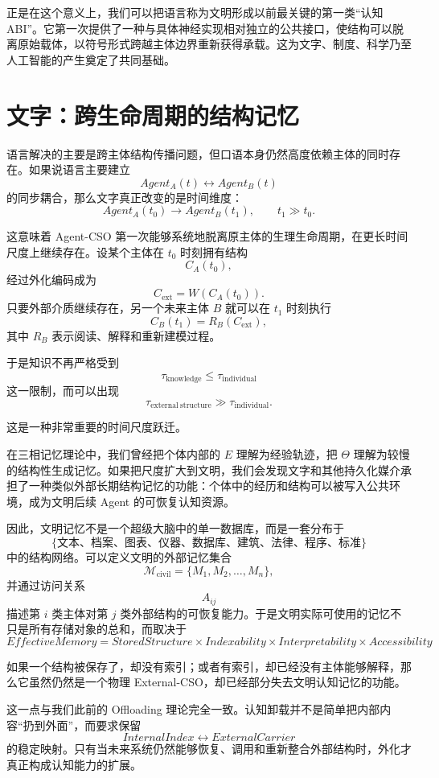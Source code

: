 正是在这个意义上，我们可以把语言称为文明形成以前最关键的第一类“认知 ABI”。它第一次提供了一种与具体神经实现相对独立的公共接口，使结构可以脱离原始载体，以符号形式跨越主体边界重新获得承载。这为文字、制度、科学乃至人工智能的产生奠定了共同基础。


\section{文字：跨生命周期的结构记忆}

语言解决的主要是跨主体结构传播问题，但口语本身仍然高度依赖主体的同时存在。如果说语言主要建立
\[
Agent_A(t)
\leftrightarrow
Agent_B(t)
\]
的同步耦合，那么文字真正改变的是时间维度：
\[
Agent_A(t_0)
\rightarrow
Agent_B(t_1),
\qquad
t_1\gg t_0.
\]

这意味着 Agent-CSO 第一次能够系统地脱离原主体的生理生命周期，在更长时间尺度上继续存在。设某个主体在 $t_0$ 时刻拥有结构
\[
C_A(t_0),
\]
经过外化编码成为
\[
C_{\mathrm{ext}}
=
W\left(C_A(t_0)\right).
\]
只要外部介质继续存在，另一个未来主体 $B$ 就可以在 $t_1$ 时刻执行
\[
C_B(t_1)
=
R_B(C_{\mathrm{ext}}),
\]
其中 $R_B$ 表示阅读、解释和重新建模过程。

于是知识不再严格受到
\[
\tau_{\mathrm{knowledge}}
\leq
\tau_{\mathrm{individual}}
\]
这一限制，而可以出现
\[
\tau_{\mathrm{external\ structure}}
\gg
\tau_{\mathrm{individual}}.
\]

这是一种非常重要的时间尺度跃迁。

在三相记忆理论中，我们曾经把个体内部的 $E$ 理解为经验轨迹，把 $\Theta$ 理解为较慢的结构性生成记忆。如果把尺度扩大到文明，我们会发现文字和其他持久化媒介承担了一种类似外部长期结构记忆的功能：个体中的经历和结构可以被写入公共环境，成为文明后续 Agent 的可恢复认知资源。

因此，文明记忆不是一个超级大脑中的单一数据库，而是一套分布于
\[
\{\text{文本、档案、图表、仪器、数据库、建筑、法律、程序、标准}\}
\]
中的结构网络。可以定义文明的外部记忆集合
\[
\mathcal{M}_{\mathrm{civil}}
=
\{M_1,M_2,\ldots,M_n\},
\]
并通过访问关系
\[
A_{ij}
\]
描述第 $i$ 类主体对第 $j$ 类外部结构的可恢复能力。于是文明实际可使用的记忆不只是所有存储对象的总和，而取决于
\[
\boxed{
EffectiveMemory
=
StoredStructure
\times
Indexability
\times
Interpretability
\times
Accessibility
}
\]

如果一个结构被保存了，却没有索引；或者有索引，却已经没有主体能够解释，那么它虽然仍然是一个物理 External-CSO，却已经部分失去文明认知记忆的功能。

这一点与我们此前的 Offloading 理论完全一致。认知卸载并不是简单把内部内容“扔到外面”，而要求保留
\[
InternalIndex
\leftrightarrow
ExternalCarrier
\]
的稳定映射。只有当未来系统仍然能够恢复、调用和重新整合外部结构时，外化才真正构成认知能力的扩展。

